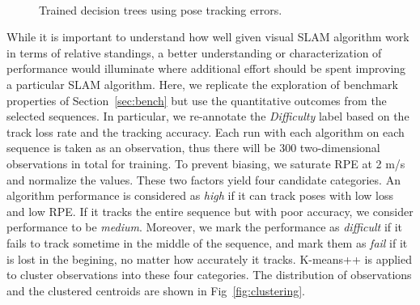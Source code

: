 \begin{figure*}[th!]
  \centering
{}
    \qquad
{}
\\
            \qquad
{}
\caption{Trained decision trees using pose tracking errors.} \label{fig:finaltrees}
\end{figure*}


While it is important to understand how well given visual SLAM algorithm
work in terms of relative standings, a better understanding or
characterization of performance would illuminate where additional effort
should be spent improving a particular SLAM algorithm. 
Here, we replicate the exploration of benchmark properties of 
Section~\ref{sec:bench} but use the quantitative outcomes from the
selected sequences.  In particular, we re-annotate the
\textit{Difficulty} label based on the track loss rate and the tracking
accuracy.
Each run with each algorithm on each sequence is taken as an observation, thus 
there will be 300 two-dimensional observations in total for training. 
To prevent biasing, we saturate RPE at 2 m/s and normalize the values. 
These two factors yield four candidate categories. 
An algorithm performance is considered as \textit{high} if it can track poses 
with low loss and low RPE. 
If it tracks the entire sequence but with poor accuracy, we consider
performance to be \textit{medium}. 
Moreover, we mark the performance as \textit{difficult} if it fails to track 
sometime in the middle of the sequence, and mark them as \textit{fail} if it 
is lost in the begining, no matter how accurately it tracks. 
K-means++\cite{arthur2007k} is applied to cluster observations into these four categories. The distribution of observations and the clustered centroids are 
shown in Fig~\ref{fig:clustering}. 

